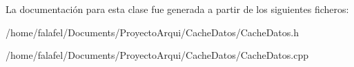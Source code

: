 La documentación para esta clase fue generada a partir de los siguientes ficheros\+:\begin{DoxyCompactItemize}
\item 
/home/falafel/\+Documents/\+Proyecto\+Arqui/\+Cache\+Datos/Cache\+Datos.\+h\item 
/home/falafel/\+Documents/\+Proyecto\+Arqui/\+Cache\+Datos/Cache\+Datos.\+cpp\end{DoxyCompactItemize}
